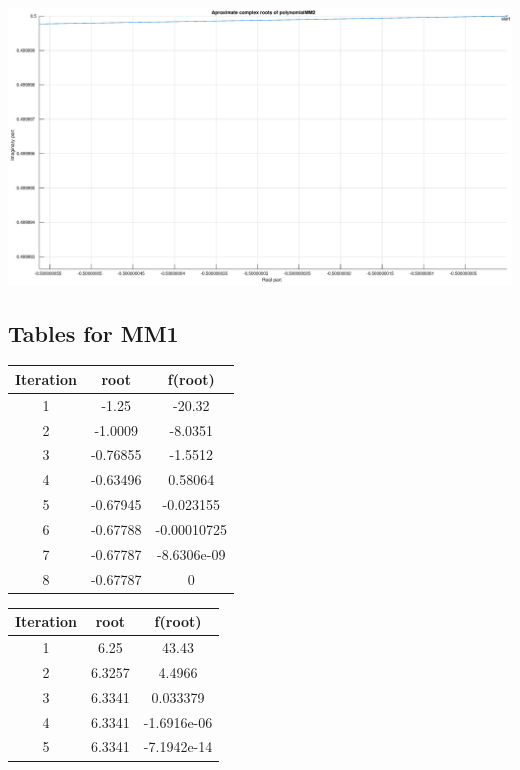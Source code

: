 \documentclass[12pt]{report}
\begin{document}
\begin{center}
   \includegraphics[scale=0.25]{task2mm2complexzommedup.eps}
\end{center}

\subsection{Tables for MM1}
\begin{center}
  \begin{tabular}{| c  c c |}
\hline
Iteration & root         & f(root) \\
\hline
1  &       -1.25   &       -20.32 \\
\hline
2  &     -1.0009   &      -8.0351 \\
\hline
3  &   -0.76855    &     -1.5512 \\
\hline
4  &    -0.63496   &     0.58064 \\
\hline
5  &    -0.67945   &   -0.023155 \\
\hline
6  &    -0.67788   &  -0.00010725 \\
\hline
7  &    -0.67787   &  -8.6306e-09 \\
\hline
8  &   -0.67787    &           0 \\
\hline

\end{tabular}
\end{center}

\begin{center}
  \begin{tabular}{| c  c c |}
\hline
Iteration & root         & f(root) \\
\hline
1   &     6.25   &        43.43 \\
\hline
2   &   6.3257   &       4.4966 \\
\hline
3   &   6.3341   &     0.033379 \\
\hline
4   &  6.3341    & -1.6916e-06 \\
\hline
5   &  6.3341    & -7.1942e-14 \\
\hline

\end{tabular}
\end{center}
\end{document}
